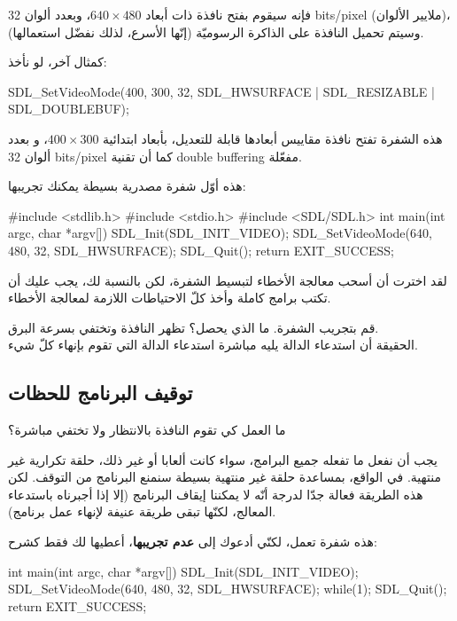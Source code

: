 فإنه سيقوم بفتح نافذة ذات أبعاد
$640 \times 480$،
 وبعدد ألوان
\textenglish{32 bits/pixel}
(ملايير الألوان)، وسيتم تحميل النافذة على الذاكرة الرسوميّة (إنّها الأسرع، لذلك نفضّل استعمالها).

كمثال آخر، لو نأخذ:

\begin{Csource}
SDL_SetVideoMode(400, 300, 32, SDL_HWSURFACE | SDL_RESIZABLE | SDL_DOUBLEBUF);
\end{Csource}

هذه الشفرة تفتح نافذة مقاييس  أبعادها قابلة للتعديل، بأبعاد ابتدائية 
$400 \times 300$،
و بعدد ألوان 
\textenglish{32 bits/pixel}
كما أن تقنية 
\textenglish{double buffering}
مفعّلة.

هذه أوّل شفرة مصدرية بسيطة يمكنك تجريبها:

\begin{Csource}
#include <stdlib.h>
#include <stdio.h>
#include <SDL/SDL.h>
int main(int argc, char *argv[])
{
	SDL_Init(SDL_INIT_VIDEO);
	SDL_SetVideoMode(640, 480, 32, SDL_HWSURFACE);
	SDL_Quit();
	return EXIT_SUCCESS;
}
\end{Csource}

لقد اخترت أن أسحب معالجة الأخطاء لتبسيط الشفرة، لكن بالنسبة لك، يجب عليك أن تكتب برامج كاملة وأخذ كلّ الاحتياطات اللازمة لمعالجة الأخطاء.

قم بتجريب الشفرة.
ما الذي يحصل؟ تظهر النافذة وتختفي بسرعة البرق.\\
الحقيقة أن استدعاء الدالة
يليه مباشرة استدعاء الدالة
التي تقوم بإنهاء كلّ شيء.

\subsection{توقيف البرنامج للحظات}

\begin{question}
ما العمل كي تقوم النافذة بالانتظار ولا تختفي مباشرة؟
\end{question}

يجب أن نفعل ما تفعله جميع البرامج، سواء كانت ألعابا أو غير ذلك، حلقة تكرارية غير منتهية. في الواقع، بمساعدة حلقة غير منتهية بسيطة سنمنع البرنامج من التوقف. لكن هذه الطريقة فعالة جدّا لدرجة أنّه لا يمكننا إيقاف البرنامج (إلا إذا أجبرناه باستدعاء المعالج، لكنّها تبقى طريقة عنيفة لإنهاء عمل برنامج).

هذه شفرة تعمل، لكنّي أدعوك إلى
\textbf{عدم تجريبها}،
أعطيها لك فقط كشرح:

\begin{Csource}
int main(int argc, char *argv[])
{
	SDL_Init(SDL_INIT_VIDEO);
	SDL_SetVideoMode(640, 480, 32, SDL_HWSURFACE);
	while(1);
	SDL_Quit();
	return EXIT_SUCCESS;
}
\end{Csource}


